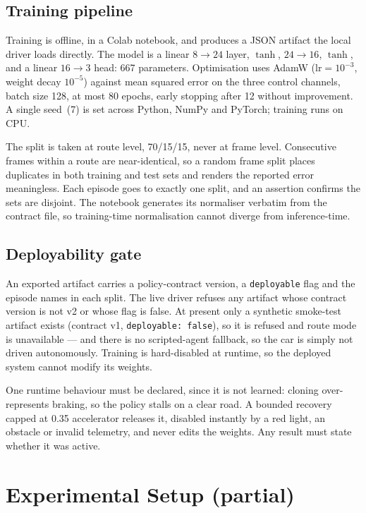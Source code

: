 \documentclass[conference]{IEEEtran}
\begin{document}
\subsection{Training pipeline}

Training is offline, in a Colab notebook, and produces a JSON artifact
the local driver loads directly. The model is a linear
$8\!\rightarrow\!24$ layer, $\tanh$, $24\!\rightarrow\!16$, $\tanh$, and
a linear $16\!\rightarrow\!3$ head: 667 parameters. Optimisation uses
AdamW ($\mathrm{lr}=10^{-3}$, weight decay $10^{-5}$) against mean
squared error on the three control channels, batch size 128, at most 80
epochs, early stopping after 12 without improvement. A single seed~(7)
is set across Python, NumPy and PyTorch; training runs on CPU.

The split is taken at route level, 70/15/15, never at frame level.
Consecutive frames within a route are near-identical, so a random frame
split places duplicates in both training and test sets and renders the
reported error meaningless. Each episode goes to exactly one split, and
an assertion confirms the sets are disjoint. The notebook generates its
normaliser verbatim from the contract file, so training-time
normalisation cannot diverge from inference-time.

\subsection{Deployability gate}

An exported artifact carries a policy-contract version, a
\texttt{deployable} flag and the episode names in each split. The live
driver refuses any artifact whose contract version is not v2 or whose
flag is false. At present only a synthetic smoke-test artifact exists
(contract v1, \texttt{deployable: false}), so it is refused and route
mode is unavailable --- and there is no scripted-agent fallback, so the
car is simply not driven autonomously. Training is hard-disabled at
runtime, so the deployed system cannot modify its weights.

One runtime behaviour must be declared, since it is not learned: cloning
over-represents braking, so the policy stalls on a clear road. A bounded
recovery capped at 0.35 accelerator releases it, disabled instantly by a
red light, an obstacle or invalid telemetry, and never edits the
weights. Any result must state whether it was active.

\section{Experimental Setup (partial)}
\end{document}
